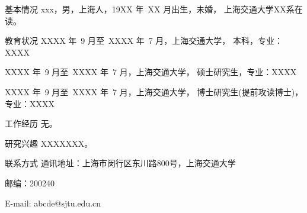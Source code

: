 
\begin{resume}

\begin{resumesection}{基本情况}
xxx，男，上海人，19XX 年~XX 月出生，未婚，
上海交通大学XX系在读。
\end{resumesection}

\begin{resumelist}{教育状况}
XXXX 年~9 月至~XXXX 年~7 月，上海交通大学， 本科，专业：XXXX

XXXX 年~9 月至~XXXX 年~7 月，上海交通大学， 硕士研究生，专业：XXXX

XXXX 年~9 月至~XXXX 年~7 月，上海交通大学，
博士研究生(提前攻读博士)，专业：XXXX
\end{resumelist}

\begin{resumelist}{工作经历}
无。
\end{resumelist}

\begin{resumelist}{研究兴趣}
XXXXXXX。
\end{resumelist}

\begin{resumelist}{联系方式}
通讯地址：上海市闵行区东川路800号，上海交通大学

邮编：200240

E-mail: abcde@sjtu.edu.cn
\end{resumelist}

\end{resume}
